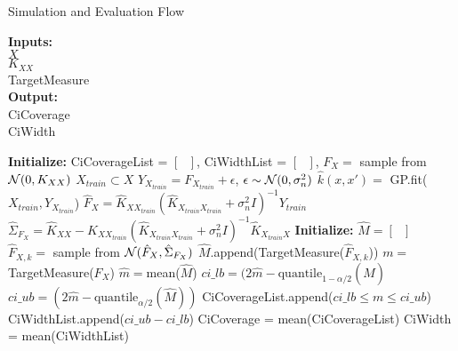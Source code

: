 \begin{algorithm}[h!] \caption{Simulation and Evaluation Flow}
 \hspace*{\algorithmicindent} \textbf{Inputs:} \\
 \hspace*{\algorithmicindent} $X$  \\
 \hspace*{\algorithmicindent} $K_{XX}$ \\
 \hspace*{\algorithmicindent} TargetMeasure  \\
 \hspace*{\algorithmicindent} \textbf{Output:} \\
 \hspace*{\algorithmicindent} CiCoverage \\
 \hspace*{\algorithmicindent} CiWidth \\
\begin{algorithmic}[1]
    \State \textbf{Initialize:} CiCoverageList = $\left[ \text{ } \right]$, CiWidthList = $\left[ \text{ } \right]$,
        \State $F_X =$ sample from $\operatorname{\mathcal{N}}(0, K_{XX})$ 
        \State $X_{train} \subset X$ 
        \State $Y_{X_{train}} = F_{X_{train}} + \epsilon$, $\epsilon \sim  \operatorname{\mathcal{N}}(0, \sigma_n^2)$
        \State $\hat{k}(x,x')=$ GP.fit($X_{train}, Y_{X_{train}}$) 
        \State $\hat{F}_X = \hat{K}_{XX_{train}} (\hat{K}_{X_{train}X_{train}} + \sigma_n^2 I)^{-1} Y_{train}$ 
        \State $\hat{\Sigma}_{F_X} = \hat{K}_{XX} -\hat{K}_{XX_{train}}(\hat{K}_{X_{train}X_{train}} + \sigma_n^2 I)^{-1}\hat{K}_{X_{train}X}$ 
        \State \textbf{Initialize:} $\hat{M} = \left[ \text{ } \right]$
            \State $\hat{F}_{X,k} = $ sample from $\operatorname{\mathcal{N}}(\hat{F}_X, \hat{\Sigma}_{F_X} )$ 
            \State $\hat{M}$.append(TargetMeasure($\hat{F}_{X, k}$)) 
        \EndFor
    \State $m =$ TargetMeasure($F_X$) 
    \State $\hat{m} = $mean($\hat{M}$)
    \State $ci\_lb = (2\hat{m} - \text{quantile}_{1-\alpha/2}(\hat{M})$ 
    \State $ci\_ub = (2\hat{m} - \text{quantile}_{\alpha/2}(\hat{M}))$ 
    \State CiCoverageList.append($ ci\_lb \leq m \leq ci\_ub$)
    \State CiWidthList.append($ci\_ub - ci\_lb $)
    \EndFor
    \State CiCoverage = mean(CiCoverageList)
    \State CiWidth = mean(CiWidthList)
\end{algorithmic}
\end{algorithm}\label{pc:simulation-evaluation-flow}

